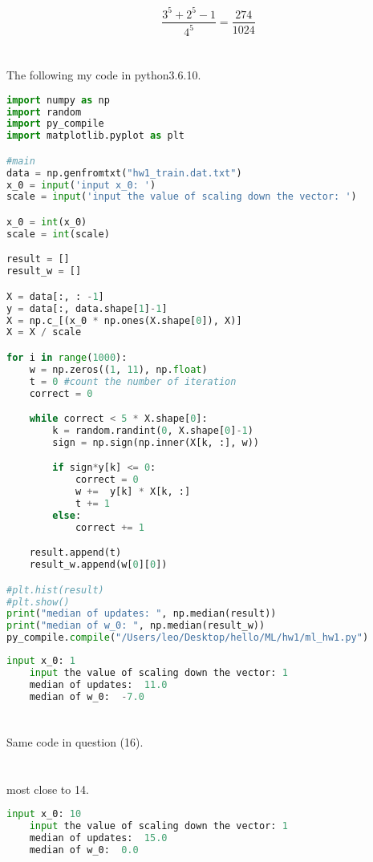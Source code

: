 \documentclass{article}
\begin{document}
\begin{CJK*}{UTF8}{bsmi}
\begin{displaymath} 
	\frac{3^5+2^5-1}{4^5} = \frac{274}{1024}
\end{displaymath} 

\section{}%
The following my code in python3.6.10.
\begin{lstlisting}[language={python}]
import numpy as np
import random
import py_compile
import matplotlib.pyplot as plt

#main
data = np.genfromtxt("hw1_train.dat.txt")
x_0 = input('input x_0: ')
scale = input('input the value of scaling down the vector: ')

x_0 = int(x_0)
scale = int(scale)

result = []
result_w = []

X = data[:, : -1]
y = data[:, data.shape[1]-1]
X = np.c_[(x_0 * np.ones(X.shape[0]), X)]
X = X / scale

for i in range(1000):
	w = np.zeros((1, 11), np.float)
	t = 0 #count the number of iteration
	correct = 0

	while correct < 5 * X.shape[0]:
		k = random.randint(0, X.shape[0]-1)
		sign = np.sign(np.inner(X[k, :], w))

		if sign*y[k] <= 0:
			correct = 0
			w +=  y[k] * X[k, :]
			t += 1
		else:
			correct += 1

	result.append(t)
	result_w.append(w[0][0])

#plt.hist(result)
#plt.show()
print("median of updates: ", np.median(result))
print("median of w_0: ", np.median(result_w))
py_compile.compile("/Users/leo/Desktop/hello/ML/hw1/ml_hw1.py")
\end{lstlisting}

\begin{lstlisting}[language={python}]
	input x_0: 1
	input the value of scaling down the vector: 1
	median of updates:  11.0
	median of w_0:  -7.0
\end{lstlisting}

\section{}%
Same code in question (16). 

\newpage
\section{}%
most close to 14.
\begin{lstlisting}[language={python}]
	input x_0: 10
	input the value of scaling down the vector: 1
	median of updates:  15.0
	median of w_0:  0.0
\end{lstlisting}


\end{CJK*}
\end{document}
